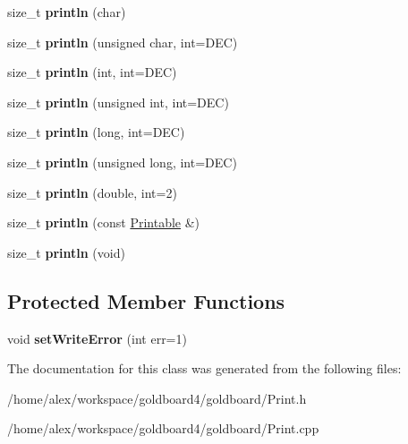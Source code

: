 \begin{DoxyCompactItemize}
\item 
size\+\_\+t {\bfseries println} (char)\hypertarget{class_print_a554896a71162f967b5794401239d7a01}{}\label{class_print_a554896a71162f967b5794401239d7a01}

\item 
size\+\_\+t {\bfseries println} (unsigned char, int=D\+EC)\hypertarget{class_print_ac9afe80f50f0118d735295aec7727e50}{}\label{class_print_ac9afe80f50f0118d735295aec7727e50}

\item 
size\+\_\+t {\bfseries println} (int, int=D\+EC)\hypertarget{class_print_a738c88471cfb8eac7c8a804699971413}{}\label{class_print_a738c88471cfb8eac7c8a804699971413}

\item 
size\+\_\+t {\bfseries println} (unsigned int, int=D\+EC)\hypertarget{class_print_ac87eed1fcb78641169ba2244278c899e}{}\label{class_print_ac87eed1fcb78641169ba2244278c899e}

\item 
size\+\_\+t {\bfseries println} (long, int=D\+EC)\hypertarget{class_print_a833fbec3ceba92e3ec95f51e026e4569}{}\label{class_print_a833fbec3ceba92e3ec95f51e026e4569}

\item 
size\+\_\+t {\bfseries println} (unsigned long, int=D\+EC)\hypertarget{class_print_aebee3c33ee5d8f10b6f378d5273742d0}{}\label{class_print_aebee3c33ee5d8f10b6f378d5273742d0}

\item 
size\+\_\+t {\bfseries println} (double, int=2)\hypertarget{class_print_a56e976b079361b6021ef7c2bedb397a2}{}\label{class_print_a56e976b079361b6021ef7c2bedb397a2}

\item 
size\+\_\+t {\bfseries println} (const \hyperlink{class_printable}{Printable} \&)\hypertarget{class_print_a20f9e104153b62e720c9b4c348b44f00}{}\label{class_print_a20f9e104153b62e720c9b4c348b44f00}

\item 
size\+\_\+t {\bfseries println} (void)\hypertarget{class_print_a169b128f9e22f0c15883768f580541a2}{}\label{class_print_a169b128f9e22f0c15883768f580541a2}

\end{DoxyCompactItemize}
\subsection*{Protected Member Functions}
\begin{DoxyCompactItemize}
\item 
void {\bfseries set\+Write\+Error} (int err=1)\hypertarget{class_print_a46656410e23c0ec14d7a01b38b3b6f00}{}\label{class_print_a46656410e23c0ec14d7a01b38b3b6f00}

\end{DoxyCompactItemize}


The documentation for this class was generated from the following files\+:\begin{DoxyCompactItemize}
\item 
/home/alex/workspace/goldboard4/goldboard/Print.\+h\item 
/home/alex/workspace/goldboard4/goldboard/Print.\+cpp\end{DoxyCompactItemize}
